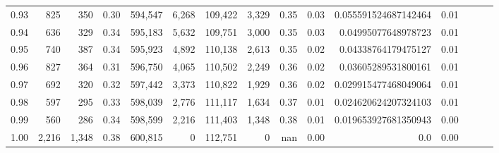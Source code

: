 \begin{tabular}{rrrrrrrrrrrrrrr}
0.93 &     825 &    350 &  0.30 &  594,547 &    6,268 &  109,422 &    3,329 &  0.35 &  0.03 &  0.055591524687142464 &      0.01 \\
0.94 &     636 &    329 &  0.34 &  595,183 &    5,632 &  109,751 &    3,000 &  0.35 &  0.03 &   0.04995077648978723 &      0.01 \\
0.95 &     740 &    387 &  0.34 &  595,923 &    4,892 &  110,138 &    2,613 &  0.35 &  0.02 &   0.04338764179475127 &      0.01 \\
0.96 &     827 &    364 &  0.31 &  596,750 &    4,065 &  110,502 &    2,249 &  0.36 &  0.02 &   0.03605289531800161 &      0.01 \\
0.97 &     692 &    320 &  0.32 &  597,442 &    3,373 &  110,822 &    1,929 &  0.36 &  0.02 &  0.029915477468049064 &      0.01 \\
0.98 &     597 &    295 &  0.33 &  598,039 &    2,776 &  111,117 &    1,634 &  0.37 &  0.01 &  0.024620624207324103 &      0.01 \\
0.99 &     560 &    286 &  0.34 &  598,599 &    2,216 &  111,403 &    1,348 &  0.38 &  0.01 &  0.019653927681350943 &      0.00 \\
1.00 &   2,216 &  1,348 &  0.38 &  600,815 &        0 &  112,751 &        0 &   nan &  0.00 &                   0.0 &      0.00 \\
\bottomrule
\end{tabular}
